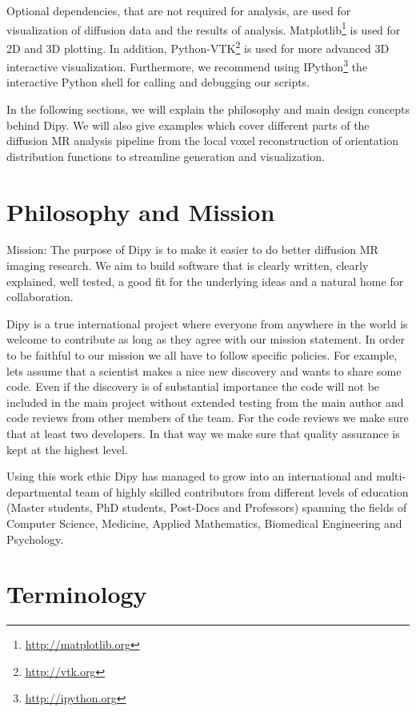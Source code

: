 \documentclass{bioinfo}
\begin{document}
Optional dependencies, that are not required for analysis, are used for visualization of diffusion data and the results of analysis. Matplotlib\footnote{\url{http://matplotlib.org}} is used for 2D and 3D plotting. In addition, Python-VTK\footnote{\url{http://vtk.org}} is used for more advanced 3D interactive visualization. Furthermore, we recommend using IPython\footnote{\url{http://ipython.org}} the interactive Python shell for calling and debugging our scripts.

In the following sections, we will explain the philosophy and main design concepts behind Dipy. We will also give examples which cover different parts of the diffusion MR analysis pipeline from the local voxel reconstruction of orientation distribution functions to streamline generation and visualization.

\section{Philosophy and Mission}

Mission: The purpose of Dipy is to make it easier to do better diffusion MR imaging research. We aim to build software that is clearly written, clearly explained, well tested, a good fit for the underlying ideas and a natural home for collaboration.

Dipy is a true international project where everyone from anywhere in the world is welcome to contribute as long as they agree with our mission statement. In order to be faithful to our mission we all have to follow specific policies. For example, lets assume that a scientist makes a nice new discovery and wants to share some code. Even if the discovery is of substantial importance the code will not be included in the main project without extended testing from the main author and code reviews from other members of the team. For the code reviews we make sure that at least two developers. In that way we make sure that quality assurance is kept at the highest level.

Using this work ethic Dipy has managed to grow into an international and multi-departmental team of highly skilled contributors from different levels of education (Master students, PhD students, Post-Docs and Professors) spanning the fields of Computer Science, Medicine, Applied Mathematics, Biomedical Engineering and Psychology.


\section{Terminology}
\end{document}
